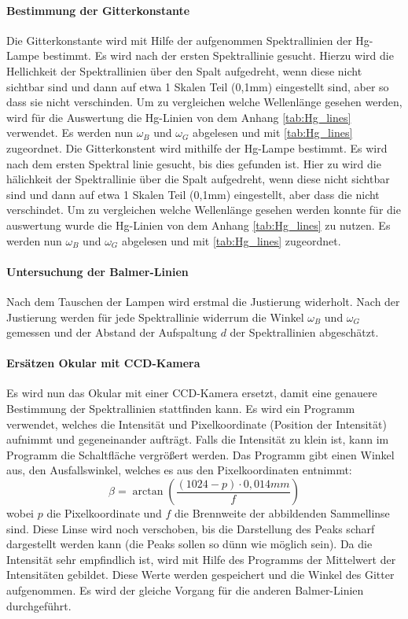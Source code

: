 \paragraph{Bestimmung der Gitterkonstante}

Die Gitterkonstante wird mit Hilfe der aufgenommen Spektrallinien der Hg-Lampe bestimmt.
Es wird nach der ersten Spektrallinie gesucht. 
Hierzu wird die Hellichkeit der Spektrallinien über den Spalt aufgedreht, wenn diese nicht sichtbar sind und dann auf etwa 1 Skalen Teil (0,1mm) eingestellt sind, aber so dass sie nicht verschinden.
Um zu vergleichen welche Wellenlänge gesehen werden, wird für die Auswertung die Hg-Linien von dem Anhang \cref{tab:Hg_lines} verwendet.
Es werden nun $\omega_B$ und $\omega_G$ abgelesen und mit \cref{tab:Hg_lines} zugeordnet.
Die Gitterkonstent wird mithilfe der Hg-Lampe bestimmt.
Es wird nach dem ersten Spektral linie gesucht, bis dies gefunden ist. 
Hier zu wird die hälichkeit der Spektrallinie über die Spalt aufgedreht, wenn diese nicht sichtbar sind und dann auf etwa 1 Skalen Teil (0,1mm) eingestellt, aber dass die nicht verschindet.
Um zu vergleichen welche Wellenlänge gesehen werden konnte für die auswertung wurde die Hg-Linien von dem Anhang \cref{tab:Hg_lines} zu nutzen.
Es werden nun $\omega_B$ und $\omega_G$ abgelesen und mit \cref{tab:Hg_lines} zugeordnet.


\paragraph{Untersuchung der Balmer-Linien}
Nach dem Tauschen der Lampen wird erstmal die Justierung widerholt. 
Nach der Justierung werden für jede Spektrallinie widerrum die Winkel $\omega_B$ und $\omega_G$ gemessen und der Abstand der Aufspaltung $d$ der Spektrallinien abgeschätzt.

\paragraph{Ersätzen Okular mit CCD-Kamera}
Es wird nun das Okular mit einer CCD-Kamera ersetzt, damit eine genauere Bestimmung der Spektrallinien stattfinden kann. 
Es wird ein Programm verwendet, welches die Intensität und Pixelkoordinate (Position der Intensität) aufnimmt und gegeneinander aufträgt. 
Falls die Intensität zu klein ist, kann im Programm die Schaltfläche vergrößert werden.
Das Programm gibt einen Winkel aus, den Ausfallswinkel, welches es aus den Pixelkoordinaten entnimmt: 
\begin{equation}
    \beta = \arctan(\frac{(1024-p)\cdot0,014mm}{f})
\end{equation}
wobei $p$ die Pixelkoordinate und $f$ die Brennweite der abbildenden Sammellinse sind.
Diese Linse wird noch verschoben, bis die Darstellung des Peaks scharf dargestellt werden kann (die Peaks sollen so dünn wie möglich sein).
Da die Intensität sehr empfindlich ist, wird mit Hilfe des Programms der Mittelwert der Intensitäten gebildet. 
Diese Werte werden gespeichert und die Winkel des Gitter aufgenommen. 
Es wird der gleiche Vorgang für die anderen Balmer-Linien durchgeführt.

